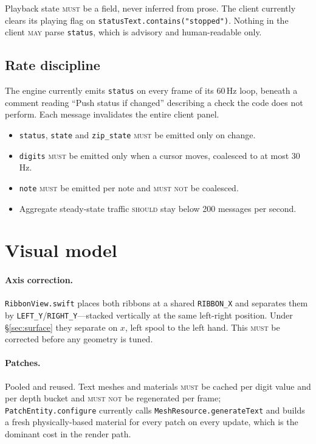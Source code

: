 \documentclass[11pt,a4paper]{article}
\newcommand{\MUST}{\textsc{must}}
\newcommand{\MUSTNOT}{\textsc{must not}}
\newcommand{\SHOULD}{\textsc{should}}
\newcommand{\MAY}{\textsc{may}}
\theoremstyle{definition}
\theoremstyle{plain}
\theoremstyle{remark}
\begin{document}
Playback state \MUST{} be a field, never inferred from prose. The client currently clears its
playing flag on \texttt{statusText.contains("stopped")}. Nothing in the client \MAY{} parse
\texttt{status}, which is advisory and human-readable only.

\subsection{Rate discipline}

The engine currently emits \texttt{status} on every frame of its 60\,Hz loop, beneath a comment
reading ``Push status if changed'' describing a check the code does not perform. Each message
invalidates the entire client panel.

\begin{itemize}[leftmargin=*]
\item \texttt{status}, \texttt{state} and \texttt{zip\_state} \MUST{} be emitted only on change.
\item \texttt{digits} \MUST{} be emitted only when a cursor moves, coalesced to at most 30\,Hz.
\item \texttt{note} \MUST{} be emitted per note and \MUSTNOT{} be coalesced.
\item Aggregate steady-state traffic \SHOULD{} stay below 200 messages per second.
\end{itemize}

\section{Visual model}

\paragraph{Axis correction.} \texttt{RibbonView.swift} places both ribbons at a shared
\texttt{RIBBON\_X} and separates them by \texttt{LEFT\_Y}/\texttt{RIGHT\_Y}---stacked vertically at
the same left-right position. Under \S\ref{sec:surface} they separate on \textbf{$x$}, left spool
to the left hand. This \MUST{} be corrected before any geometry is tuned.

\paragraph{Patches.} Pooled and reused. Text meshes and materials \MUST{} be cached per digit value
and per depth bucket and \MUSTNOT{} be regenerated per frame; \texttt{PatchEntity.configure}
currently calls \texttt{MeshResource.generateText} and builds a fresh physically-based material for
every patch on every update, which is the dominant cost in the render path.
\end{document}
